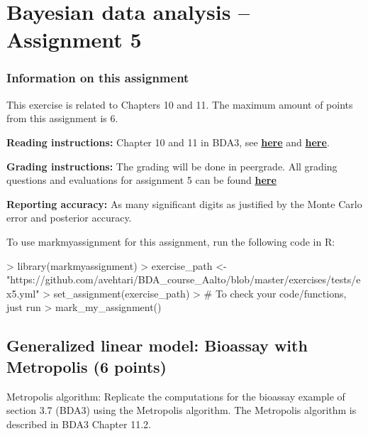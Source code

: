 \documentclass[a4paper,11pt]{article}
\begin{document}

\thispagestyle{empty}

\section*{Bayesian data analysis -- Assignment 5}




\newpage

\subsubsection*{Information on this assignment}
This exercise is related to Chapters 10 and 11. The maximum amount of points from this assignment is 6. 

\textbf{Reading instructions:} Chapter 10 and 11 in BDA3, see \href{https://github.com/avehtari/BDA_course_Aalto/blob/master/chapter_notes/BDA_notes_ch10.pdf}{\textbf{here}} and \href{https://github.com/avehtari/BDA_course_Aalto/blob/master/chapter_notes/BDA_notes_ch11.pdf}{\textbf{here}}.

\textbf{Grading instructions:} The grading will be done in peergrade. All grading questions and evaluations for assignment 5 can be found \href{https://github.com/avehtari/BDA_course_Aalto/blob/master/exercises/ex5_rubric.md}{\textbf{here}}

\textbf{Reporting accuracy:} As many significant digits as justified by the Monte Carlo error and posterior accuracy.

To use markmyassignment for this assignment, run the following code in R:


\begin{Schunk}
\begin{Sinput}
> library(markmyassignment)
> exercise_path <- 
    "https://github.com/avehtari/BDA_course_Aalto/blob/master/exercises/tests/ex5.yml"
> set_assignment(exercise_path)
> # To check your code/functions, just run
> mark_my_assignment()
\end{Sinput}
\end{Schunk}

\newpage

\subsection*{Generalized linear model: Bioassay with Metropolis (6 points)}

Metropolis algorithm: Replicate the computations for the bioassay
example of section 3.7 (BDA3) using the Metropolis algorithm. The Metropolis algorithm is described in BDA3 Chapter 11.2. 
\end{document}
